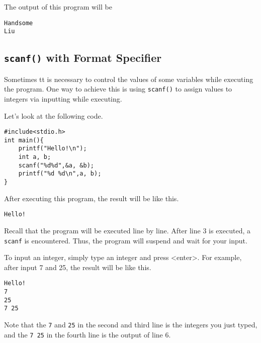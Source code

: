 \documentclass{report}
\begin{document}
The output of this program will be
\begin{lstlisting}[style=CLStyle]
Handsome
Liu
\end{lstlisting}

    \subsection{\texttt{scanf()} with Format Specifier}
    Sometimes tt is necessary to control the values of some variables while executing the program. One way to achieve this is using \texttt{scanf()} to assign values to integers via inputting while executing.

    Let's look at the following code.

\begin{lstlisting}[style=CStyle]
#include<stdio.h>
int main(){
    printf("Hello!\n");
    int a, b;
    scanf("%d%d",&a, &b);
    printf("%d %d\n",a, b);
}
\end{lstlisting}
After executing this program, the result will be like this.
\begin{lstlisting}[style=CLStyle]
Hello!

\end{lstlisting}
Recall that the program will be executed line by line. After line 3 is executed, a \texttt{scanf} is encountered. Thus, the program will suspend and wait for your input.

To input an integer, simply type an integer and press <enter>. For example, after input 7 and 25, the result will be like this.

\begin{lstlisting}[style=CLStyle]
Hello!
7
25
7 25
\end{lstlisting}
Note that the \texttt{7} and \texttt{25} in the second and third line is the integers you just typed, and the \texttt{7 25} in the fourth line is the output of line 6.
\end{document}
